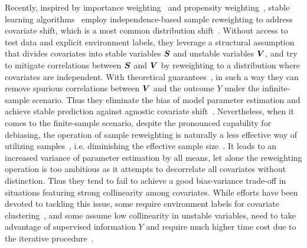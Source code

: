 Recently, inspired by importance weighting~\citep{huang2006correcting,bickel2009discriminative} and propensity weighting~\citep{li2018balancing,lee2010improving}, 
stable learning algorithms~\citep{kuang2020stable, shen2020stable,zhang2021deep} employ independence-based sample reweighting to address covariate shift, which is a most common distribution shift~\citep{shen2021towards}. Without access to test data and explicit environment labels, they leverage a structural assumption that divides covariates into stable variables $\boldsymbol{S}$ and unstable variables $\boldsymbol{V}$, and try to mitigate correlations between $\boldsymbol{S}$ and $\boldsymbol{V}$ by reweighting to a distribution where covariates are independent. 
With theoretical guarantees~\citep{xu2021stable}, in such a way they can remove spurious correlations between $\boldsymbol{V}$ and the outcome $Y$ under the infinite-sample scenario. Thus they eliminate the bias of model parameter estimation and achieve stable prediction against agnostic covariate shift~\cite{cui2022stable}. 
Nevertheless, when it comes to the finite-sample scenario, despite the pronounced capability for debiasing, the operation of sample reweighting is naturally a less effective way of utilizing samples~\citep{kish1965survey}, i.e. diminishing the effective sample size~\citep{martino2017effective}. It leads to an increased variance of parameter estimation by all means, let alone the reweighting operation is too ambitious as it attempts to decorrelate all covariates without distinction. 
Thus they tend to fail to achieve a good bias-variance trade-off in situations featuring strong collinearity among covariates. While efforts have been devoted to tackling this issue, some require environment labels for covariate clustering~\citep{shen2020stable2}, and some assume low collinearity in unstable variables, 
need to take advantage of supervised information $Y$ and require much higher time cost due to the iterative procedure~\citep{yu2023stable}. 

